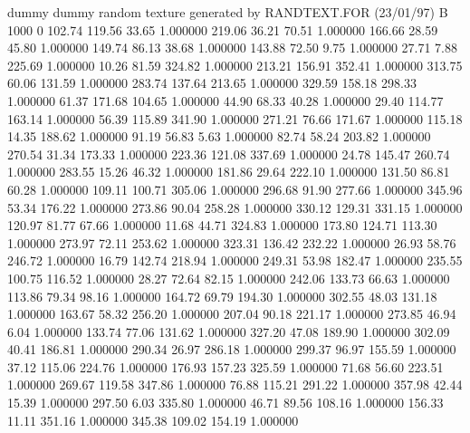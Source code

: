 dummy
dummy
random texture generated by RANDTEXT.FOR (23/01/97)
B   1000   0
    102.74    119.56     33.65  1.000000
    219.06     36.21     70.51  1.000000
    166.66     28.59     45.80  1.000000
    149.74     86.13     38.68  1.000000
    143.88     72.50      9.75  1.000000
     27.71      7.88    225.69  1.000000
     10.26     81.59    324.82  1.000000
    213.21    156.91    352.41  1.000000
    313.75     60.06    131.59  1.000000
    283.74    137.64    213.65  1.000000
    329.59    158.18    298.33  1.000000
     61.37    171.68    104.65  1.000000
     44.90     68.33     40.28  1.000000
     29.40    114.77    163.14  1.000000
     56.39    115.89    341.90  1.000000
    271.21     76.66    171.67  1.000000
    115.18     14.35    188.62  1.000000
     91.19     56.83      5.63  1.000000
     82.74     58.24    203.82  1.000000
    270.54     31.34    173.33  1.000000
    223.36    121.08    337.69  1.000000
     24.78    145.47    260.74  1.000000
    283.55     15.26     46.32  1.000000
    181.86     29.64    222.10  1.000000
    131.50     86.81     60.28  1.000000
    109.11    100.71    305.06  1.000000
    296.68     91.90    277.66  1.000000
    345.96     53.34    176.22  1.000000
    273.86     90.04    258.28  1.000000
    330.12    129.31    331.15  1.000000
    120.97     81.77     67.66  1.000000
     11.68     44.71    324.83  1.000000
    173.80    124.71    113.30  1.000000
    273.97     72.11    253.62  1.000000
    323.31    136.42    232.22  1.000000
     26.93     58.76    246.72  1.000000
     16.79    142.74    218.94  1.000000
    249.31     53.98    182.47  1.000000
    235.55    100.75    116.52  1.000000
     28.27     72.64     82.15  1.000000
    242.06    133.73     66.63  1.000000
    113.86     79.34     98.16  1.000000
    164.72     69.79    194.30  1.000000
    302.55     48.03    131.18  1.000000
    163.67     58.32    256.20  1.000000
    207.04     90.18    221.17  1.000000
    273.85     46.94      6.04  1.000000
    133.74     77.06    131.62  1.000000
    327.20     47.08    189.90  1.000000
    302.09     40.41    186.81  1.000000
    290.34     26.97    286.18  1.000000
    299.37     96.97    155.59  1.000000
     37.12    115.06    224.76  1.000000
    176.93    157.23    325.59  1.000000
     71.68     56.60    223.51  1.000000
    269.67    119.58    347.86  1.000000
     76.88    115.21    291.22  1.000000
    357.98     42.44     15.39  1.000000
    297.50      6.03    335.80  1.000000
     46.71     89.56    108.16  1.000000
    156.33     11.11    351.16  1.000000
    345.38    109.02    154.19  1.000000
